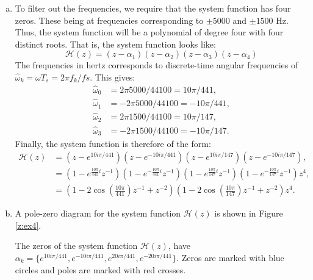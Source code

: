 \begin{enumerate}
\begin{enumerate}[a)]
\item To filter out the frequencies, we require that the system function has four zeros. These being at frequencies corresponding to $\pm5000$ and $\pm1500$ Hz. Thus, the system function will be a polynomial of degree four with four distinct roots. That is, the system function looks like:
$$\mathcal{H}(z)=(z-\alpha_1)(z-\alpha_2)(z-\alpha_3)(z-\alpha_4)$$
The frequencies in hertz corresponds to discrete-time angular frequencies of $\hat{\omega}_k=\omega T_s=2\pi f_k/fs$. This gives:
\begin{align*}
    \hat{\omega}_{0} &=  2\pi5000/44100 =  10\pi/441,\\
    \hat{\omega}_{1} &= -2\pi5000/44100 = -10\pi/441,\\
    \hat{\omega}_{2} &=  2\pi1500/44100 =  10\pi/147,\\
    \hat{\omega}_{3} &= -2\pi1500/44100 = -10\pi/147.
\end{align*}
Finally, the system function is therefore of the form:
\begin{align*}
    \mathcal{H}(z)&=(z-e^{10i\pi/441})(z-e^{-10i\pi/441})(z-e^{10i\pi/147})(z-e^{-10i\pi/147}), \\
    &=(1-e^{\frac{10\pi}{441}i}z^{-1})(1-e^{-\frac{10\pi}{441}i}z^{-1})(1-e^{\frac{10\pi}{147}i}z^{-1})(1-e^{-\frac{10\pi}{147}i}z^{-1})z^{4},\\
    &=(1-2\cos\left(\frac{10\pi}{441}\right)z^{-1}+z^{-2})(1-2\cos\left(\frac{10\pi}{147}\right)z^{-1}+z^{-2})z^{4}.
\end{align*}

\item A pole-zero diagram for the system function $\mathcal{H}(z)$ is shown in Figure \ref{z:ex4}.

\begin{marginfigure}
\begin{center}
\end{center}
\caption{The zeros of the system function $\mathcal{H}(z)$,
have $\alpha_k=\{e^{10i\pi/441},e^{-10i\pi/441},e^{20i\pi/441},e^{-20i\pi/441}\}$. Zeros are marked with blue circles and poles are marked with red crosses.}
\label{z:ex4}
\end{marginfigure}


\end{enumerate}
\end{enumerate}
